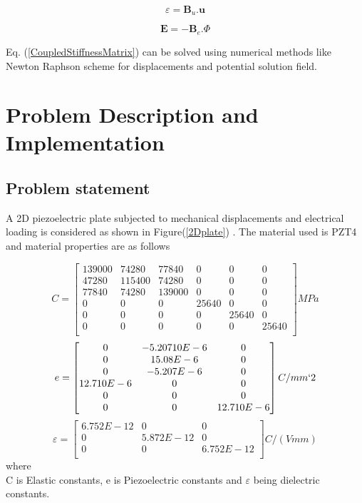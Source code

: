 \documentclass[12pt]{article}
\begin{document}
\begin{equation}
\varepsilon = \textbf{B}_u . \textbf{u}
\end{equation}

\begin{equation}
\textbf{E} = - \textbf{B}_e . \Phi
\end{equation}

\noindent
Eq. (\ref{CoupledStiffnessMatrix}) can be solved using numerical methods like Newton Raphson scheme for displacements and potential solution field.

\section{Problem Description and Implementation}

\subsection{Problem statement}
A 2D piezoelectric plate subjected to mechanical displacements and electrical loading is considered as shown in Figure(\ref{2Dplate}) . The material used is PZT4 and material properties are as follows

$$
C = \begin{bmatrix}
139000 & 74280 & 77840 & 0 & 0 & 0\\
47280 & 115400 & 74280 & 0 & 0 & 0\\
77840 & 74280 & 139000 & 0 & 0 & 0\\
0 & 0 & 0 & 25640 & 0 & 0\\
0 & 0 & 0 & 0 & 25640 & 0\\
0 & 0 & 0 & 0 & 0 & 25640\\
\end{bmatrix} MPa
$$  
$$
e = \begin{bmatrix}
0 & -5.20710E-6 & 0 \\
0 & 15.08E-6 & 0 \\
0 & -5.207E-6 & 0\\
12.710E-6 & 0 & 0 \\
0 & 0 & 0 \\
0 & 0 & 12.710E-6 \\
\end{bmatrix} C/ mm`2
$$
$$
\varepsilon = \begin{bmatrix}
6.752E-12 & 0 & 0 \\
0 & 5.872E-12 & 0 \\
0 & 0 & 6.752E-12\\
\end{bmatrix} C/(V mm)
$$
where \\
C is Elastic constants, e is Piezoelectric constants and $\varepsilon$ being dielectric constants.
\end{document}
